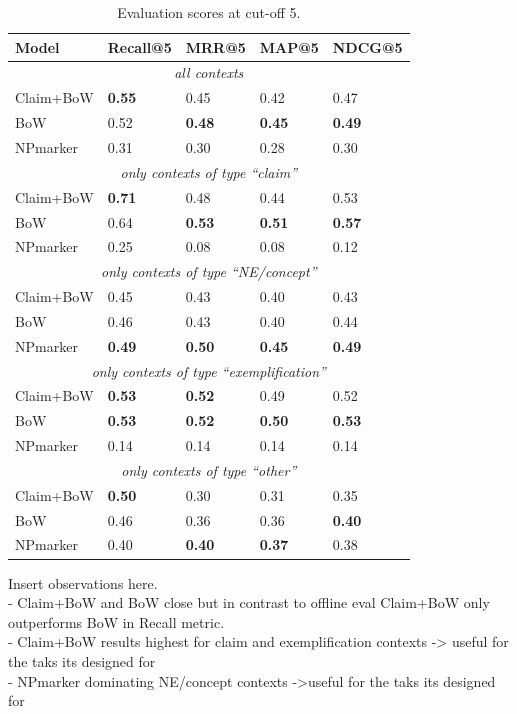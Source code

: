\begin{table}[tb]
\centering
    \caption{Evaluation scores at cut-off 5.}
    \label{tab:arxivevalnumbers}
\begin{center}
    \begin{tabular}{lllll}
    \toprule
    Model & Recall@5 & MRR@5 & MAP@5 & NDCG@5 \\
    \midrule
    \multicolumn{5}{c}{\emph{all contexts}} \\
    \midrule
    Claim+BoW & \textbf{0.55} & 0.45 & 0.42 & 0.47 \\
    BoW       & 0.52 & \textbf{0.48} & \textbf{0.45} & \textbf{0.49} \\
    NPmarker  & 0.31 & 0.30 & 0.28 & 0.30 \\
    \midrule
    \multicolumn{5}{c}{\emph{only contexts of type ``claim''}} \\
    \midrule
    Claim+BoW & \textbf{0.71} & 0.48 & 0.44 & 0.53 \\
    BoW       & 0.64 & \textbf{0.53} & \textbf{0.51} & \textbf{0.57} \\
    NPmarker  & 0.25 & 0.08 & 0.08 & 0.12 \\
    \midrule
    \multicolumn{5}{c}{\emph{only contexts of type ``NE/concept''}} \\
    \midrule
    Claim+BoW & 0.45 & 0.43 & 0.40 & 0.43 \\
    BoW       & 0.46 & 0.43 & 0.40 & 0.44 \\
    NPmarker  & \textbf{0.49} & \textbf{0.50} & \textbf{0.45} & \textbf{0.49} \\
    \midrule
    \multicolumn{5}{c}{\emph{only contexts of type ``exemplification''}} \\
    \midrule
    Claim+BoW & \textbf{0.53} & \textbf{0.52} & 0.49 & 0.52 \\
    BoW       & \textbf{0.53} & \textbf{0.52} & \textbf{0.50} & \textbf{0.53} \\
    NPmarker  & 0.14 & 0.14 & 0.14 & 0.14 \\
    \midrule
    \multicolumn{5}{c}{\emph{only contexts of type ``other''}} \\
    \midrule
    Claim+BoW & \textbf{0.50} & 0.30 & 0.31 & 0.35 \\
    BoW       & 0.46 & 0.36 & 0.36 & \textbf{0.40} \\
    NPmarker  & 0.40 & \textbf{0.40} & \textbf{0.37} & 0.38 \\
    \bottomrule
    \end{tabular}
\end{center}
\end{table}

Insert observations here.\\
- Claim+BoW and BoW close but in contrast to offline eval Claim+BoW only outperforms BoW in Recall metric.\\
- Claim+BoW results highest for claim and exemplification contexts -> useful for the taks its designed for\\
- NPmarker dominating NE/concept contexts ->useful for the taks its designed for
